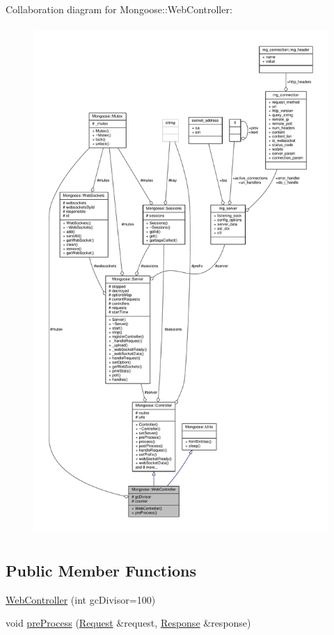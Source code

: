 Collaboration diagram for Mongoose\+:\+:Web\+Controller\+:
\nopagebreak
\begin{figure}[H]
\begin{center}
\leavevmode
\includegraphics[height=550pt]{da/de9/classMongoose_1_1WebController__coll__graph}
\end{center}
\end{figure}
\subsection*{Public Member Functions}
\begin{DoxyCompactItemize}
\item 
\hyperlink{classMongoose_1_1WebController_a15b894f06fc589f5ef67d78fce5a3577}{Web\+Controller} (int gc\+Divisor=100)
\item 
void \hyperlink{classMongoose_1_1WebController_acd7b2317485e2b19fe1ffbb5d69e6c00}{pre\+Process} (\hyperlink{classMongoose_1_1Request}{Request} \&request, \hyperlink{classMongoose_1_1Response}{Response} \&response)
\end{DoxyCompactItemize}
